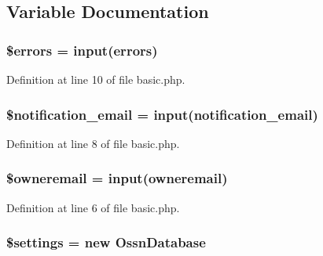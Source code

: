 \subsection{Variable Documentation}
\subsubsection[{\texorpdfstring{\$errors}{$errors}}]{\setlength{\rightskip}{0pt plus 5cm}\$errors = {\bf input}(\textquotesingle{}errors\textquotesingle{})}\hypertarget{basic_8php_ab24faf4aa647cdcee494fc48524ad4ff}{}\label{basic_8php_ab24faf4aa647cdcee494fc48524ad4ff}


Definition at line 10 of file basic.\+php.

\subsubsection[{\texorpdfstring{\$notification\+\_\+email}{$notification_email}}]{\setlength{\rightskip}{0pt plus 5cm}\$notification\+\_\+email = {\bf input}(\textquotesingle{}notification\+\_\+email\textquotesingle{})}\hypertarget{basic_8php_af4e8b9d68c020fc6db842a8cfa17ca68}{}\label{basic_8php_af4e8b9d68c020fc6db842a8cfa17ca68}


Definition at line 8 of file basic.\+php.

\subsubsection[{\texorpdfstring{\$owneremail}{$owneremail}}]{\setlength{\rightskip}{0pt plus 5cm}\$owneremail = {\bf input}(\textquotesingle{}owneremail\textquotesingle{})}\hypertarget{basic_8php_a9985cec845427a278f1883040f17c82a}{}\label{basic_8php_a9985cec845427a278f1883040f17c82a}


Definition at line 6 of file basic.\+php.

\subsubsection[{\texorpdfstring{\$settings}{$settings}}]{\setlength{\rightskip}{0pt plus 5cm}\$settings = new {\bf Ossn\+Database}}\hypertarget{basic_8php_ac7c3353107070daa85f641882931b358}{}\label{basic_8php_ac7c3353107070daa85f641882931b358}



